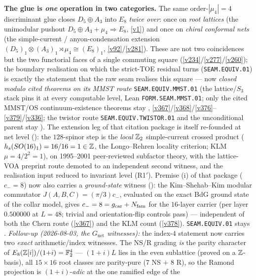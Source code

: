 \par\smallskip\noindent\textbf{The glue is \emph{one} operation in two categories.} The same
order-$|\mu_4|{=}4$ discriminant glue closes $D_5\oplus A_3$ into $E_8$ \emph{twice over}: once on
\emph{root lattices} (the unimodular pushout $D_5\oplus A_3+\mu_4\Rightarrow E_8$, \vref{v1}) and once on
\emph{chiral conformal nets} (the simple-current / anyon-condensation extension
$(D_5)_1\otimes(A_3)_1\rtimes\mu_4\cong(E_8)_1$, \vref{v92}/\vref{v281}). These are not two coincidences but
the two functorial faces of a single commuting square (\vref{v234}/\vref{v277}/\vref{v260}); the boundary
realisation on which the strict-TOE residual turns (\texttt{SEAM.EQUIV.01}) is exactly the statement that the
raw seam realises this square --- now \emph{closed modulo cited theorems on its MMST route}
\texttt{SEAM.EQUIV.MMST.01} (the lattice/$S_3$ stack pins it at
every computable level, Lean \texttt{FORM.SEAM.MMST.01}; only the cited MMST/OS continuum-existence theorems stay
\mO, \vref{v367}/\vref{v368}/\vref{v376}--\vref{v379}/\vref{v336}; the twistor route
\texttt{SEAM.EQUIV.TWISTOR.01} and the unconditional parent stay \mO). The extension leg of that citation package is
itself re-founded at net level (): the $128$-spinor step is the
\emph{local} $\mathbb{Z}_2$ simple-current crossed product ($h_s(SO(16)_1)=16/16=1\in\mathbb{Z}$, the Longo--Rehren locality
criterion; KLM $\mu=4/2^2=1$), on 1995--2001 peer-reviewed subfactor theory, with the lattice-VOA preprint route
demoted to an independent second witness, and the realisation input reduced to invariant level (R1$'$).
Premise (i) of that package ($c_-{=}8$) now also carries a \emph{ground-state} witness
(): the Kim--Shehab--Kim modular commutator
$J(A,B,C)=(\pi/3)c_-$, evaluated on the exact BdG ground state of the collar model, gives $c_-=8=g_{\mathrm{car}}+N_{\mathrm{fam}}$
for the $16$-layer carrier (per layer $0.500000$ at $L{=}48$; trivial and orientation-flip controls pass) ---
independent of both the Chern route (\vref{v367}) and the KLM count (\vref{v378}).
\texttt{SEAM.EQUIV.01} stays \mO.
\emph{Follow-up (2026-08-03, the $G_{\mathrm{net}}$ witnesses):} the
index-$4$ statement now carries two \emph{exact} arithmetic/index
witnesses.  The NS/R grading \emph{is} the parity character of
$E_8(\mathbb{Z}[i])/(1{+}i)=\mathbb F_2^4$ --- $(1{+}i)L$ lies in the even
sublattice (proved on a $\mathbb{Z}$-basis), all $15\times16$ root classes
are parity-pure ($7$ NS $+$ $8$ R), so the Ramond projection is
$(1{+}i)$-\emph{adic} at the one ramified edge of the
